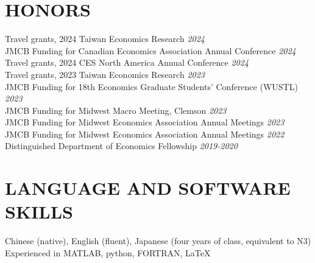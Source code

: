 \documentclass[12pt]{res} %
\begin{document}
\begin{resume}
\section{HONORS}
\vspace{8pt} %
Travel grants, 2024 Taiwan Economics Research \hfill \textit{2024} \\
JMCB Funding for Canadian Economics Association Annual Conference \hfill \textit{2024} \\
Travel grants, 2024 CES North America Annual Conference \hfill \textit{2024} \\
Travel grants, 2023 Taiwan Economics Research \hfill \textit{2023} \\
JMCB Funding for 18th Economics Graduate Students' Conference (WUSTL) \hfill \textit{2023} \\
JMCB Funding for Midwest Macro Meeting, Clemson \hfill \textit{2023} \\
JMCB Funding for Midwest Economics Association Annual Meetings \hfill \textit{2023} \\
JMCB Funding for Midwest Economics Association Annual Meetings \hfill \textit{2022} \\
Distinguished Department of Economics Fellowship \hfill  \textit{2019-2020}


\section{LANGUAGE AND SOFTWARE SKILLS}
\vspace{8pt} %
Chinese (native), English (fluent), Japanese (four years of class, equivalent to N3) \\
Experienced in MATLAB, python, FORTRAN, \LaTeX{}


\end{resume}
\end{document}
